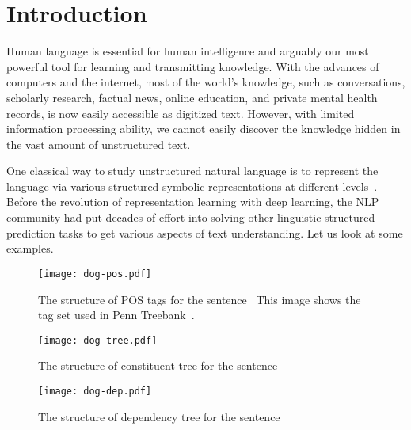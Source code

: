
\chapter{Introduction}
\label{chap:intro}

Human language is essential for human intelligence and arguably our
most powerful tool for learning and transmitting knowledge. With the
advances of computers and the internet, most of the world's knowledge,
such as conversations, scholarly research, factual news, online
education, and private mental health records, is now easily accessible
as digitized text. However, with limited information processing
ability, we cannot easily discover the knowledge hidden in the vast
amount of unstructured text.

One classical way to study unstructured natural language is to
represent the language via various structured symbolic representations
at different levels~\citep{smith2011linguistic}. Before the revolution
of representation learning with deep learning, the NLP community had
put decades of effort into solving other linguistic structured
prediction tasks to get various aspects of text understanding. Let us
look at some examples.

\begin{figure}[!tbp]
\begin{center}
\texttt{[image: dog-pos.pdf]}
\end{center}
\caption{\label{fig:intro:dog-pos}The structure of POS tags for the
  sentence \emph{}~This image shows the tag set used in Penn
  Treebank~\cite{marcus-etal-1994-penn}.}
\end{figure}

\begin{figure}[!tbp]
\begin{center}
\texttt{[image: dog-tree.pdf]}
\end{center}
\caption{\label{fig:intro:dog-tree}The structure of constituent tree
  for the sentence~\emph{}}
\end{figure}

\begin{figure}[!tbp]
\begin{center}
\texttt{[image: dog-dep.pdf]}
\end{center}
\caption{\label{fig:intro:dog-dep}The structure of dependency tree for
  the sentence \emph{}}
\end{figure}

